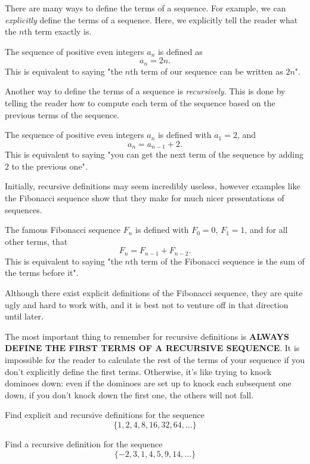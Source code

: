 There are many ways to define the terms of a sequence. For example, we can \emph{explicitly} define the terms of a sequence. Here, we explicitly tell the reader what the $n$th term exactly is.
\begin{example}
    The sequence of positive even integers $a_n$ is defined as
    \[a_n=2n.\]
    This is equivalent to saying "the $n$th term of our sequence can be written as $2n$".
\end{example}
Another way to define the terms of a sequence is \emph{recursively}. This is done by telling the reader how to compute each term of the sequence based on the previous terms of the sequence.
\begin{example}
    The sequence of positive even integers $a_n$ is defined with $a_1=2$, and
    \[a_n=a_{n-1}+2.\]
    This is equivalent to saying "you can get the next term of the sequence by adding $2$ to the previous one".
\end{example}
Initially, recursive definitions may seem incredibly useless, however examples like the Fibonacci sequence show that they make for much nicer presentations of sequences.
\begin{example}
    The famous Fibonacci sequence $F_n$ is defined with $F_0=0$, $F_1=1$, and for all other terms, that
    \[F_n=F_{n-1}+F_{n-2}.\]
    This is equivalent to saying "the $n$th term of the Fibonacci sequence is the sum of the terms before it". 
\end{example}
\begin{remark}
    Although there exist explicit definitions of the Fibonacci sequence, they are quite ugly and hard to work with, and it is best not to venture off in that direction until later. 
\end{remark}
The most important thing to remember for recursive definitions is \textbf{ALWAYS DEFINE THE FIRST TERMS OF A RECURSIVE SEQUENCE}. It is impossible for the reader to calculate the rest of the terms of your sequence if you don't explicitly define the first terms. Otherwise, it's like trying to knock dominoes down: even if the dominoes are set up to knock each subsequent one down, if you don't knock down the first one, the others will not fall.
\begin{exercise}
    Find explicit and recursive definitions for the sequence 
    \[\{1, 2, 4, 8, 16, 32, 64,\dots\}\]
\end{exercise}
\begin{exercise}
    Find a recursive definition for the sequence
    \[\{-2, 3, 1, 4, 5, 9, 14,\dots\}\]
\end{exercise}

